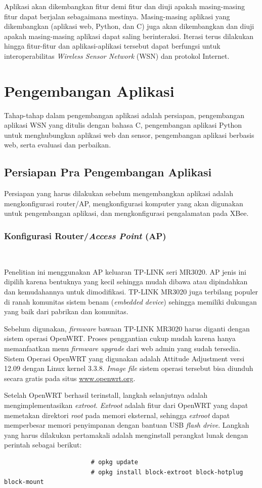 			Aplikasi akan dikembangkan fitur demi fitur dan diuji apakah masing-masing fitur dapat berjalan sebagaimana mestinya. Masing-masing aplikasi yang dikembangkan (aplikasi web, Python, dan C) juga akan dikembangkan dan diuji apakah masing-masing aplikasi dapat saling berinteraksi. Iterasi terus dilakukan hingga fitur-fitur dan aplikasi-aplikasi tersebut dapat berfungsi untuk interoperabilitas \emph{Wireless Sensor Network} (WSN) dan protokol Internet.
	
	\section{Pengembangan Aplikasi}
		Tahap-tahap dalam pengembangan aplikasi adalah persiapan, pengembangan aplikasi WSN yang ditulis dengan bahasa C, pengembangan aplikasi Python untuk menghubungkan aplikasi web dan sensor, pengembangan aplikasi berbasis web, serta evaluasi dan perbaikan.

		\subsection{Persiapan Pra Pengembangan Aplikasi}
			Persiapan yang harus dilakukan sebelum mengembangkan aplikasi adalah mengkonfigurasi router/AP, mengkonfigurasi komputer yang akan digunakan untuk pengembangan aplikasi, dan mengkonfigurasi pengalamatan pada XBee.

			
			\subsubsection{Konfigurasi Router/\emph{Access Point} (AP)} \

				Penelitian ini menggunakan AP keluaran TP-LINK seri MR3020. AP jenis ini dipilih karena bentuknya yang kecil sehingga mudah dibawa atau dipindahkan dan kemudahannya untuk dimodifikasi. TP-LINK MR3020 juga terbilang populer di ranah komunitas sistem benam (\emph{embedded device}) sehingga memiliki dukungan yang baik dari pabrikan dan komunitas. 

				Sebelum digunakan, \emph{firmware} bawaan TP-LINK MR3020 harus diganti dengan sistem operasi OpenWRT. Proses penggantian cukup mudah karena hanya memanfaatkan menu \emph{firmware upgrade} dari web admin yang sudah tersedia.	Sistem Operasi OpenWRT yang digunakan adalah Attitude Adjustment versi 12.09 dengan Linux kernel 3.3.8. \emph{Image file} sistem operasi tersebut bisa diunduh secara gratis pada situs \url{www.openwrt.org}.

				Setelah OpenWRT berhasil terinstall, langkah selanjutnya adalah mengimplementasikan \emph{extroot}. \emph{Extroot} adalah fitur dari OpenWRT yang dapat memetakan direktori \emph{root} pada memori eksternal, sehingga \emph{extroot} dapat memperbesar memori penyimpanan dengan bantuan USB \emph{flash drive}. Langkah yang harus dilakukan pertamakali adalah menginstall perangkat lunak dengan perintah sebagai berikut:
				\begingroup
				    \fontsize{10pt}{12pt}\selectfont
				    \begin{verbatim}
						# opkg update
						# opkg install block-extroot block-hotplug block-mount
				    \end{verbatim}  
				\endgroup

